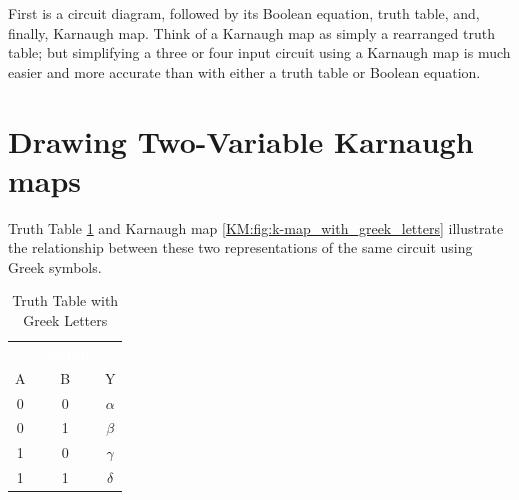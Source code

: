 
First is a circuit diagram, followed by its Boolean equation, truth table, and, finally, Karnaugh map. Think of a Karnaugh map as simply a rearranged truth table; but simplifying a three or four input circuit using a Karnaugh map is much easier and more accurate than with either a truth table or Boolean equation. 

\section{Drawing Two-Variable Karnaugh maps}
\label{KM:sec:drawing_2_variable_karnaugh_maps}

Truth Table \ref{KM:tab:truth_table_with_greek_letters} and Karnaugh map \ref{KM:fig:k-map_with_greek_letters} illustrate the relationship between these two representations of the same circuit using Greek symbols. 

\begin{table}[H]
  \sffamily
  \newcommand{\head}[1]{\textcolor{white}{\textbf{#1}}}    
  \begin{center}
    \begin{tabular}{ccc} 
      \rowcolor{black!75}
      \multicolumn{2}{c}{\head{Inputs}} & \head{Output} \\
      A & B & Y \\
      \hline
      0 & 0 & $ \alpha $ \\
      0 & 1 & $ \beta $ \\
      1 & 0 & $ \gamma $ \\
      1 & 1 & $ \delta $ 
    \end{tabular}
  \end{center}
  \caption{Truth Table with Greek Letters}
  \label{KM:tab:truth_table_with_greek_letters}
\end{table}


